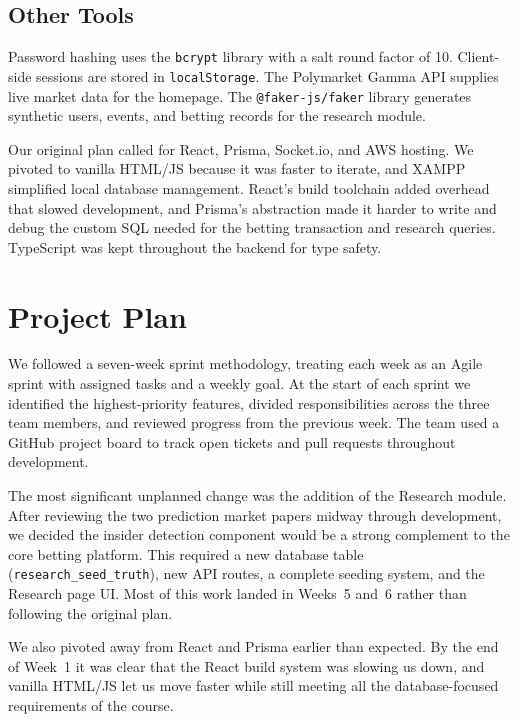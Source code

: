 \documentclass[sigconf,nonacm]{acmart}
\begin{document}
\subsection{Other Tools}
Password hashing uses the \texttt{bcrypt} library with a salt round
factor of 10. Client-side sessions are stored in \texttt{localStorage}.
The Polymarket Gamma API supplies live market data for the homepage.
The \texttt{@faker-js/faker} library generates synthetic users, events,
and betting records for the research module.

Our original plan called for React, Prisma, Socket.io, and AWS hosting.
We pivoted to vanilla HTML/JS because it was faster to iterate, and
XAMPP simplified local database management. React's build toolchain
added overhead that slowed development, and Prisma's abstraction made
it harder to write and debug the custom SQL needed for the betting
transaction and research queries. TypeScript was kept throughout the
backend for type safety.

\section{Project Plan}

We followed a seven-week sprint methodology, treating each week as an
Agile sprint with assigned tasks and a weekly goal. At the start of
each sprint we identified the highest-priority features, divided
responsibilities across the three team members, and reviewed progress
from the previous week. The team used a GitHub project board to track
open tickets and pull requests throughout development.

The most significant unplanned change was the addition of the Research
module. After reviewing the two prediction market papers midway through
development, we decided the insider detection component would be a
strong complement to the core betting platform. This required a new
database table (\texttt{research\_seed\_truth}), new API routes, a
complete seeding system, and the Research page UI. Most of this work
landed in Weeks~5 and~6 rather than following the original plan.

We also pivoted away from React and Prisma earlier than expected.
By the end of Week~1 it was clear that the React build system was
slowing us down, and vanilla HTML/JS let us move faster while still
meeting all the database-focused requirements of the course.

\end{document}
